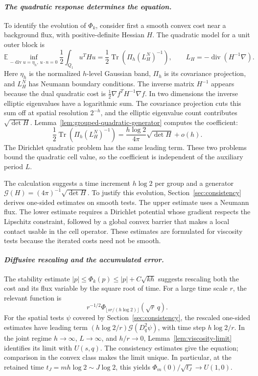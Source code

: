 \documentclass[11pt,reqno]{amsart}
\theoremstyle{plain}
\theoremstyle{definition}
\theoremstyle{remark}
\numberwithin{equation}{section}
\newcommand{\1}{\mathbf 1}
\begin{document}
\smallskip
\paragraph{\textit{The quadratic response determines the equation.}}
To identify the evolution of $\Phi_k$, consider first a smooth convex cost
near a background flux, with positive-definite Hessian $H$.  The
quadratic model for a unit outer block is
\[
\mathbb E\inf_{-\operatorname{div}u=\eta_h,\ u\cdot n=0}
\frac12\int_{Q_1}u^THu
=\frac12\operatorname{Tr}\!\left(\Pi_h(L_H^N)^{-1}\right),
\qquad L_H=-\operatorname{div}(H^{-1}\nabla).
\]
Here $\eta_h$ is the normalized $h$-level Gaussian band, $\Pi_h$ is its
covariance projection, and $L_H^N$ has Neumann boundary conditions.
The inverse matrix $H^{-1}$ appears because the dual quadratic cost is
$\frac12\nabla f^TH^{-1}\nabla f$.
In two dimensions the inverse elliptic eigenvalues have a logarithmic
sum.  The covariance projection cuts this sum off at spatial resolution
$2^{-h}$, and the elliptic eigenvalue count contributes
$\sqrt{\det H}$.  Lemma~\ref{lem:grouped-quadratic-generator} computes
the coefficient:
\[
\frac12\operatorname{Tr}\!\left(\Pi_h(L_H^N)^{-1}\right)
=\frac{h\log2}{4\pi}\sqrt{\det H}+o(h).
\]
The Dirichlet quadratic problem has the same leading term.  These two
problems bound the quadratic cell value, so the coefficient is independent
of the auxiliary period $L$.

The calculation suggests a time increment $h\log2$ per group and a
generator $\mathcal G(H)=(4\pi)^{-1}\sqrt{\det H}$.  To justify this evolution,
Section~\ref{sec:consistency} derives one-sided estimates
on smooth tests.  The upper estimate uses a Neumann flux.  The lower
estimate requires a Dirichlet potential whose gradient respects the
Lipschitz constraint, followed by a global convex barrier that makes a
local contact usable in the cell operator.  These estimates are formulated
for viscosity tests because the iterated costs need not be smooth.

\smallskip
\paragraph{\textit{Diffusive rescaling and the accumulated error.}}
The stability estimate $|p|\leq\Phi_k(p)\leq|p|+C\sqrt{kh}$ suggests
rescaling both the cost and its flux variable by the square root of time.
For a large time scale $r$, the relevant function is
\[
r^{-1/2}\Phi_{\lfloor sr/(h\log2)\rfloor}(\sqrt r\,q).
\]
For the spatial tests $\psi$ covered by Section~\ref{sec:consistency},
the rescaled one-sided estimates have leading term
$(h\log2/r)\mathcal G(D_q^2\psi)$, with time step $h\log2/r$.
In the joint regime $h\to\infty$, $L\to\infty$, and $h/r\to0$,
Lemma~\ref{lem:viscosity-limit} identifies its limit with $U(s,q)$.
The consistency estimates give the equation; comparison in the convex
class makes the limit unique.  In particular, at the retained time
$t_J=mh\log2\sim J\log2$, this yields
$\Phi_m(0)/\sqrt{t_J}\to U(1,0)$.
\end{document}
